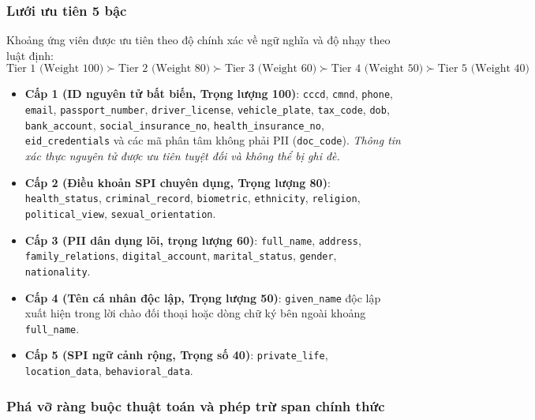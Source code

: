 \documentclass[
  11pt,
  a4paper,
]{article}
\providecommand{\tightlist}{%
  \setlength{\itemsep}{0pt}\setlength{\parskip}{0pt}}
\begin{document}
\subsubsection{Lưới ưu tiên 5
bậc}\label{lux1b0ux1edbi-ux1b0u-tiuxean-5-bux1eadc}

Khoảng ứng viên được ưu tiên theo độ chính xác về ngữ nghĩa và độ nhạy
theo luật định:
\[\text{Tier 1 (Weight 100)} \succ \text{Tier 2 (Weight 80)} \succ \text{Tier 3 (Weight 60)} \succ \text{Tier 4 (Weight 50)} \succ \text{Tier 5 (Weight 40)}\]

\begin{itemize}
\tightlist
\item
  \textbf{Cấp 1 (ID nguyên tử bất biến, Trọng lượng 100)}:
  \texttt{cccd}, \texttt{cmnd}, \texttt{phone}, \texttt{email},
  \texttt{passport\_number}, \texttt{driver\_license},
  \texttt{vehicle\_plate}, \texttt{tax\_code}, \texttt{dob},
  \texttt{bank\_account}, \texttt{social\_insurance\_no},
  \texttt{health\_insurance\_no}, \texttt{eid\_credentials} và các mã
  phân tâm không phải PII (\texttt{doc\_code}). \emph{Thông tin xác thực
  nguyên tử được ưu tiên tuyệt đối và không thể bị ghi đè.}
\item
  \textbf{Cấp 2 (Điều khoản SPI chuyên dụng, Trọng lượng 80)}:
  \texttt{health\_status}, \texttt{criminal\_record},
  \texttt{biometric}, \texttt{ethnicity}, \texttt{religion},
  \texttt{political\_view}, \texttt{sexual\_orientation}.
\item
  \textbf{Cấp 3 (PII dân dụng lõi, trọng lượng 60)}:
  \texttt{full\_name}, \texttt{address}, \texttt{family\_relations},
  \texttt{digital\_account}, \texttt{marital\_status}, \texttt{gender},
  \texttt{nationality}.
\item
  \textbf{Cấp 4 (Tên cá nhân độc lập, Trọng lượng 50)}:
  \texttt{given\_name} độc lập xuất hiện trong lời chào đối thoại hoặc
  dòng chữ ký bên ngoài khoảng \texttt{full\_name}.
\item
  \textbf{Cấp 5 (SPI ngữ cảnh rộng, Trọng số 40)}:
  \texttt{private\_life}, \texttt{location\_data},
  \texttt{behavioral\_data}.
\end{itemize}

\subsubsection{Phá vỡ ràng buộc thuật toán và phép trừ span chính
thức}\label{phuxe1-vux1ee1-ruxe0ng-buux1ed9c-thuux1eadt-touxe1n-vuxe0-phuxe9p-trux1eeb-span-chuxednh-thux1ee9c}
\end{document}
